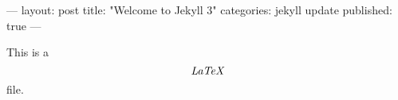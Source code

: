 ---
layout: post
title:  "Welcome to Jekyll 3"
categories: jekyll update
published: true
---


This is a $$\emph{LaTeX}$$ file.